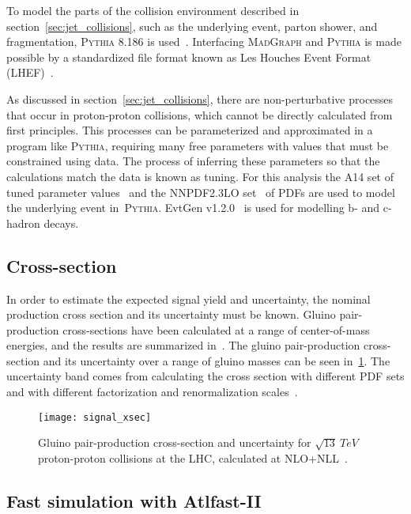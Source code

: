 To model the parts of the collision environment described in section~\ref{sec:jet_collisions}, such as the underlying event, parton shower, and fragmentation, \textsc{Pythia} 8.186 is used~\cite{signal-pythia}.
Interfacing \textsc{MadGraph} and \textsc{Pythia} is made possible by a standardized file format known as Les Houches Event Format (LHEF)~\cite{signal-lhef}.

As discussed in section~\ref{sec:jet_collisions}, there are non-perturbative processes that occur in proton-proton collisions, which cannot be directly calculated from first principles.
This processes can be parameterized and approximated in a program like \textsc{Pythia}, requiring many free parameters with values that must be constrained using data.
The process of inferring these parameters so that the calculations match the data is known as tuning.
For this analysis the A14 set of tuned parameter values~\cite{signal-pythia-a14,signal-pythia-tunes} and the NNPDF2.3LO set~\cite{signal-nnpdf} of PDFs are used to model the underlying event in~\textsc{Pythia}.
EvtGen v1.2.0~\cite{mc-evtgen} is used for modelling b- and c-hadron decays.

\subsection{Cross-section}\label{subsec:signal_cross_section}
In order to estimate the expected signal yield and uncertainty, the nominal production cross section and its uncertainty must be known.
Gluino pair-production cross-sections have been calculated at a range of center-of-mass energies, and the results are summarized in~\cite{signal-xsec}.
The gluino pair-production cross-section and its uncertainty over a range of gluino masses can be seen in~\ref{fig:signal_xsec}.
The uncertainty band comes from calculating the cross section with different PDF sets and with different factorization and renormalization scales~\cite{signal-xsec}.
\begin{figure}[!ht]\centering
    \texttt{[image: signal\_xsec]}
    \caption{Gluino pair-production cross-section and uncertainty for $\sqrt{13}~TeV$ proton-proton collisions at the LHC, calculated at NLO+NLL~\cite{signal-xsec}.}
    \label{fig:signal_xsec}
\end{figure}

\subsection{Fast simulation with Atlfast-II}\label{subsec:fastsim}

